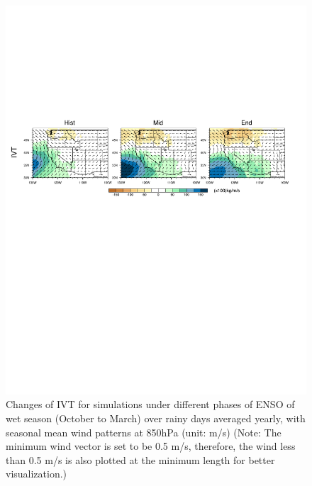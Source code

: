 \begin{figure}
\begin{center}
\includegraphics[width=6in]{discussion_enso.pdf}
\caption{Changes of IVT for simulations under different phases of ENSO of wet season (October to March) over rainy days averaged yearly, with seasonal mean wind patterns at 850hPa (unit: m/s) (Note: The minimum wind vector is set to be 0.5 m/s, therefore, the wind less than 0.5 m/s is also plotted at the minimum length for better visualization.)}
\label{fig:discussEnso}
\end{center}
\end{figure}

